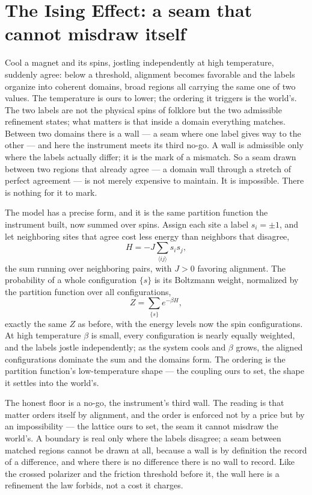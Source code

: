 \section{The Ising Effect: a seam that cannot misdraw itself}
\label{se:ising}

Cool a magnet and its spins, jostling independently at high temperature, suddenly agree: below a threshold,
alignment becomes favorable and the labels organize into coherent domains, broad regions all carrying the same
one of two values. The temperature is ours to lower; the ordering it triggers is the world's. The two labels are not the physical spins of folklore but the two admissible refinement
states; what matters is that inside a domain everything matches. Between two domains there is a wall --- a seam
where one label gives way to the other --- and here the instrument meets its third no-go. A wall is
admissible only where the labels actually differ; it is the mark of a mismatch. So a seam drawn between two
regions that already agree --- a domain wall through a stretch of perfect agreement --- is not merely
expensive to maintain. It is impossible. There is nothing for it to mark.

The model has a precise form, and it is the same partition function the instrument built, now summed over
spins. Assign each site a label $s_i = \pm 1$, and let neighboring sites that agree cost less energy than
neighbors that disagree,
\begin{equation}
  H = -J\sum_{\langle ij\rangle} s_i s_j,
\end{equation}
the sum running over neighboring pairs, with $J > 0$ favoring alignment. The probability of a whole
configuration $\{s\}$ is its Boltzmann weight, normalized by the partition function over all configurations,
\begin{equation}
  Z = \sum_{\{s\}} e^{-\beta H},
\end{equation}
exactly the same $Z$ as before, with the energy levels now the spin configurations. At high
temperature $\beta$ is small, every configuration is nearly equally weighted, and the labels jostle
independently; as the system cools and $\beta$ grows, the aligned configurations dominate the sum and the
domains form. The ordering is the partition function's low-temperature shape --- the coupling ours to set, the
shape it settles into the world's.

The honest floor is a no-go, the instrument's third wall. The reading is that matter orders itself by
alignment, and the order is enforced not by a price but by an impossibility --- the lattice ours to set, the
seam it cannot misdraw the world's. A boundary is real only where the labels
disagree; a seam between matched regions cannot be drawn at all, because a wall is by definition the record of
a difference, and where there is no difference there is no wall to record. Like the crossed polarizer and the
friction threshold before it, the wall here is a refinement the law forbids, not a cost it charges.

